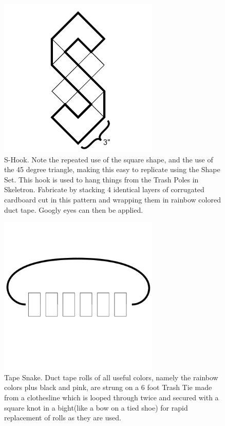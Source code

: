 \begin{figure}
	\centering
	\includegraphics[width=3in]{figures/actiongeometry/shook.png}
	\caption[shook]
	{S-Hook.  Note the repeated use of the square shape, and the use of the 45 degree triangle, making this easy to replicate using the Shape Set.  This hook is used to hang things from the Trash Poles in Skeletron. Fabricate by stacking 4 identical layers of corrugated cardboard cut in this pattern and wrapping them in rainbow colored duct tape.  Googly eyes can then be applied.}
\end{figure}


\begin{figure}
	\centering
	\includegraphics[width=3in]{figures/actiongeometry/tapesnake.png}
	\caption[tapesnake]
	{Tape Snake.  Duct tape rolls of all useful colors, namely the rainbow colors plus black and pink, are strung on a 6 foot Trash Tie made from a clothesline which is looped through twice and secured with a square knot in a bight(like a bow on a tied shoe) for rapid replacement of rolls as they are used.}
\end{figure}


